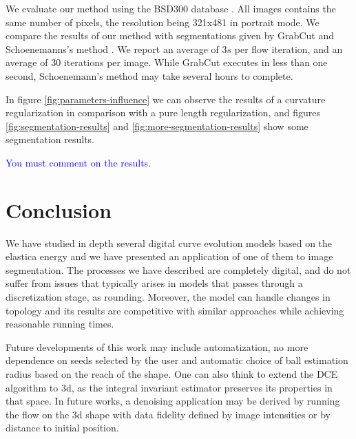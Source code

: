 \documentclass[runningheads]{llncs}
\newcommand{\todo}[1]{{\textcolor{blue}{#1}}}
\begin{document}
We evaluate our method using the BSD300 database \cite{martinFTM01berkeley}. All images contains the same number of pixels, the resolution being 321x481 in portrait mode. We compare the results of our method with segmentations given by GrabCut and Schoenemanns's method \cite{schoenemann09linear}. We report an average of $3s$ per flow iteration, and an average of $30$ iterations per image. While GrabCut executes in less than one second, Schoenemann's method may take several hours to complete.


In figure \ref{fig:parameters-influence} we can observe the results of a curvature regularization in comparison with a pure length regularization, and figures \ref{fig:segmentation-results} and \ref{fig:more-segmentation-results} show some segmentation results.

\todo{You must comment on the results.}

\section{Conclusion}\label{sec:conclusion}


We have studied in depth several digital curve evolution models based
on the elastica energy and we have presented an application of one of
them to image segmentation. The processes we have described are
completely digital, and do not suffer from issues that typically
arises in models that passes through a discretization stage, as
rounding. Moreover, the model can handle changes in topology and its
results are competitive with similar approaches while achieving
reasonable running times.

Future developments of this work may include automatization, no more
dependence on seeds selected by the user and automatic choice of ball
estimation radius based on the reach of the shape. One can also think
to extend the DCE algorithm to $3$d, as the integral invariant
estimator preserves its properties in that space. In future works, a
denoising application may be derived by running the flow on the $3$d
shape with data fidelity defined by image intensities or by distance
to initial position.



%
%
%


\end{document}

